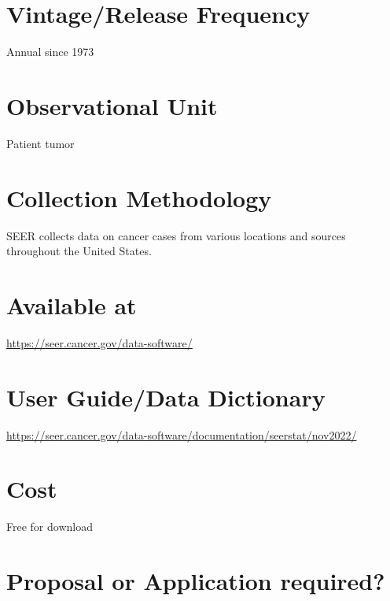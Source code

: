 \documentclass[
]{book}
\begin{document}
\hypertarget{vintagerelease-frequency-87}{%
\section{Vintage/Release Frequency}\label{vintagerelease-frequency-87}}

Annual since 1973

\hypertarget{observational-unit-87}{%
\section{Observational Unit}\label{observational-unit-87}}

Patient tumor

\hypertarget{collection-methodology-87}{%
\section{Collection Methodology}\label{collection-methodology-87}}

SEER collects data on cancer cases from various locations and sources throughout the United States.

\hypertarget{available-at-87}{%
\section{Available at}\label{available-at-87}}

\url{https://seer.cancer.gov/data-software/}

\hypertarget{user-guidedata-dictionary-87}{%
\section{User Guide/Data Dictionary}\label{user-guidedata-dictionary-87}}

\url{https://seer.cancer.gov/data-software/documentation/seerstat/nov2022/}

\hypertarget{cost-87}{%
\section{Cost}\label{cost-87}}

Free for download

\hypertarget{proposal-or-application-required-87}{%
\section{Proposal or Application required?}\label{proposal-or-application-required-87}}
\end{document}
